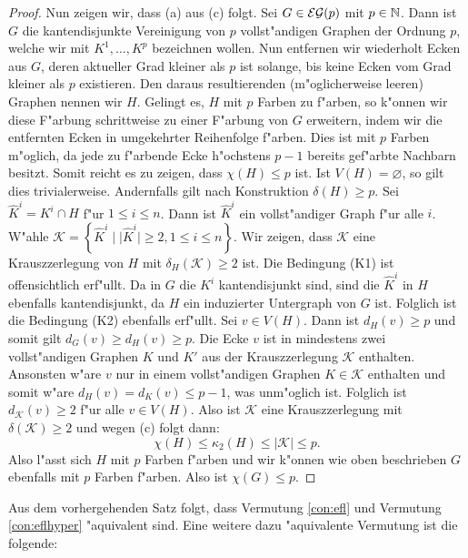 \begin{proof}
  Nun zeigen wir, dass (a) aus (c) folgt. 
  Sei $G\in {\cal EG}(p) $ mit $p\in {\mathbb{N}}$. Dann ist $G$ die kantendisjunkte Vereinigung von $p$ vollst"andigen Graphen der Ordnung $p$, welche wir mit $K^{1},\dots, K^{p}$ bezeichnen wollen. Nun entfernen wir wiederholt Ecken aus $G$,  deren aktueller Grad kleiner als $p$ ist solange, bis keine Ecken vom Grad kleiner als $p$ existieren. Den daraus resultierenden (m"oglicherweise leeren) Graphen nennen wir $H$. 
  Gelingt es, $H$ mit $p$ Farben zu f"arben, so k"onnen wir diese F"arbung schrittweise zu einer F"arbung von $G$ erweitern, indem wir die entfernten Ecken in umgekehrter Reihenfolge f"arben. Dies ist mit $p$ Farben m"oglich, da jede zu f"arbende Ecke h"ochstens $p-1$ bereits gef"arbte Nachbarn besitzt.
  Somit reicht es zu zeigen, dass $\chi(H) \leq p$ ist. Ist $V(H) =\varnothing$, so gilt dies trivialerweise. Andernfalls gilt nach Konstruktion $\delta(H) \geq p $. 
  Sei $\hat{K}^i = K^{i} \cap H$ f"ur $1\leq i \leq n$. Dann ist $\hat{K}^i$ ein vollst"andiger Graph f"ur alle $i$. W"ahle $\mathcal{K} = \left\{ \hat{K}^i \;|\; | \hat{K}^i| \geq 2  , 1\leq i \leq n\right\}$. Wir zeigen, dass $\mathcal{K}$ eine Krauszzerlegung von $H$ mit $\delta_{H}(\mathcal{K}) \geq 2$ ist.
  Die Bedingung (K1) ist offensichtlich erf"ullt. Da in $G$ die $K^{i}$ kantendisjunkt sind, sind die $\hat{K}^{i}$ in $H$ ebenfalls kantendisjunkt, da $H$ ein induzierter Untergraph von $G$ ist. Folglich ist die Bedingung (K2) ebenfalls erf"ullt. Sei $v\in V(H)$. Dann ist $d_{H}(v) \geq p$ und somit gilt $d_{G}(v) \geq d_H(v) \geq p$. 
  Die Ecke $v$ ist in mindestens zwei vollst"andigen Graphen $K$ und $K'$ aus der Krauszzerlegung $\mathcal{K}$ enthalten. 
  Ansonsten w"are $v$ nur in einem vollst"andigen Graphen $K \in \mathcal{K}$ enthalten und somit w"are $d_{H}(v) = d_{K}(v) \leq p-1$, was unm"oglich ist. 
  Folglich ist $d_{\mathcal{K}}(v) \geq 2$ f"ur alle $v \in V(H)$. Also ist $\mathcal{K}$ eine Krauszzerlegung mit $\delta(\mathcal{K}) \geq 2$ und wegen (c) folgt dann:
  \begin{equation*}
    \chi(H) \leq \kappa_{2}(H) \leq |\mathcal{K}| \leq p .
  \end{equation*}
  Also l"asst sich $H$ mit $p$ Farben f"arben und wir k"onnen wie oben beschrieben $G$ ebenfalls mit $p$ Farben f"arben. Also ist $\chi(G) \leq p$.
\end{proof}

Aus dem vorhergehenden Satz folgt, dass Vermutung \ref{con:efl} und Vermutung \ref{con:eflhyper} "aquivalent sind. Eine weitere dazu "aquivalente Vermutung ist die folgende:

